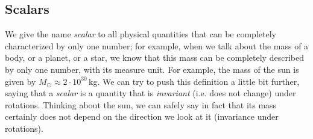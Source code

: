 \subsection{Scalars}
We give the name \textit{scalar} to all physical quantities that can be completely characterized by only one number; for example, when we talk about the mass of a body, or a planet, or a star, we know that this mass can be completely described by only one number, with its measure unit. For example, the mass of the sun is given by $M_\odot\approx 2\cdot 10^{30}$\,kg. We can try to push this definition a little bit further, saying that a \textit{scalar} is a quantity that is \textit{invariant} (i.e. does not change) under rotations. Thinking about the sun, we can safely say in fact that its mass certainly does not depend on the direction we look at it (invariance under rotations). 
